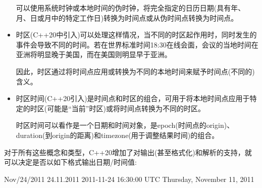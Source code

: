 \begin{itemize}
可以使用系统时钟或本地时间的伪时钟，将完全指定的日历日期(具有年、月、日或月中的特定工作日)转换为时间点或从伪时间点转换为时间点。

\item
时区(C++20中引入)可以处理这样情况，当不同的时区起作用时，同时发生的事件会导致不同的时间。若在世界标准时间18:30在线会面，会议的当地时间在亚洲将明显晚于美国，而在美国则明显早于亚洲。

因此，时区通过将时间点应用或转换为不同的本地时间来赋予时间点(不同的)含义。

\item
时区时间(C++20引入)是时间点和时区的组合，可用于将本地时间点应用于特定的时区(可能是“当前”时区)或将时间点转换为不同的时区。

时区时间可以看作是一个日期和时间对象，是epoch(时间点的origin)、duration(到origin的距离)和timezone(用于调整结果时间)的组合。
\end{itemize}

对于所有这些概念和类型，C++20增加了对输出(甚至格式化)和解析的支持，就可以决定是否以如下格式输出日期/时间值:

\begin{shell}
Nov/24/2011
24.11.2011
2011-11-24 16:30:00 UTC
Thursday, November 11, 2011
\end{shell}